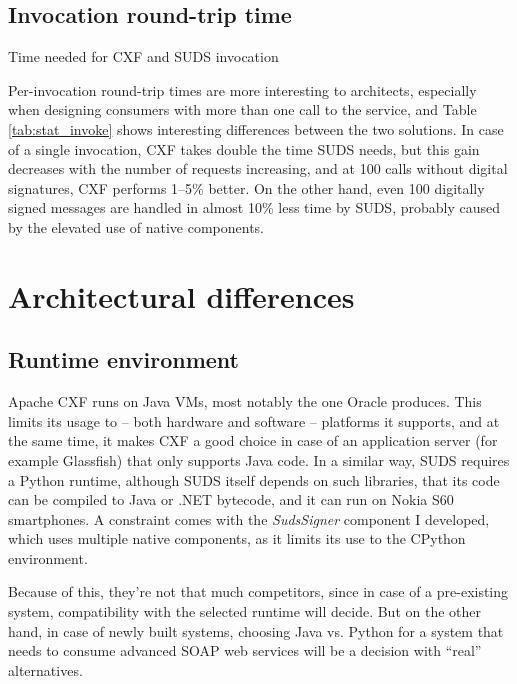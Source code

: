 \subsection{Invocation round-trip time}

\begin{table}[htbp]
 \begin{center}
  
  \caption{Time needed for CXF and SUDS invocation}
  \label{tab:stat_invoke}
 \end{center}
\end{table}

\noindent
Per-invocation round-trip times are more interesting to architects, especially when designing consumers with more than one call to the service, and Table \ref{tab:stat_invoke} shows interesting differences between the two solutions. In case of a single invocation, CXF takes double the time SUDS needs, but this gain decreases with the number of requests increasing, and at 100 calls without digital signatures, CXF performs 1--5\% better. On the other hand, even 100 digitally signed messages are handled in almost 10\% less time by SUDS, probably caused by the elevated use of native components.

\section{Architectural differences}

\subsection{Runtime environment}

Apache CXF runs on Java VMs, most notably the one Oracle produces. This limits its usage to -- both hardware and software -- platforms it supports, and at the same time, it makes CXF a good choice in case of an application server (for example Glassfish) that only supports Java code. In a similar way, SUDS requires a Python runtime, although SUDS itself depends on such libraries, that its code can be compiled to Java or .NET bytecode, and it can run on Nokia S60 smartphones. A constraint comes with the \emph{SudsSigner} component I developed, which uses multiple native components, as it limits its use to the CPython environment.

Because of this, they're not that much competitors, since in case of a pre-existing system, compatibility with the selected runtime will decide. But on the other hand, in case of newly built systems, choosing Java vs. Python for a system that needs to consume advanced SOAP web services will be a decision with ``real'' alternatives.

